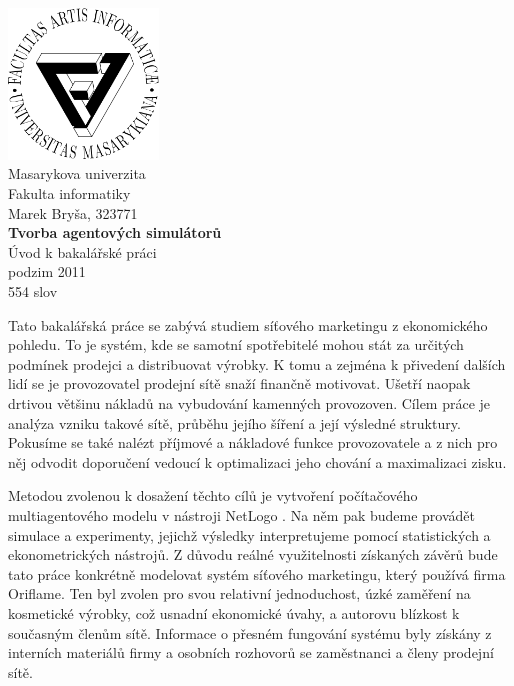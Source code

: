 \documentclass[a4paper,11pt]{report}
\begin{document}
\thispagestyle{empty}
\pagebreak
\mbox{}%
\\[2cm]
\begin{center}
\includegraphics[width=0.3\textwidth]{./filogo.pdf}\\[1cm]    

{\large Masarykova univerzita}\\[0.5cm]
{\large Fakulta informatiky}\\[0.5cm]
{\large Marek Bryša, 323771}\\[0.5cm]
{ \huge \bfseries Tvorba agentových simulátorů}\\[0.4cm]
{\large Úvod k bakalářské práci}\\[0.7cm]
\vfill
{\large podzim 2011}\\
{\large 554 slov}\\



\pagebreak

\end{center}

Tato bakalářská práce se zabývá studiem síťového marketingu z ekonomického pohledu. To je systém, kde se samotní spotřebitelé mohou stát za určitých podmínek prodejci a distribuovat výrobky. K tomu a zejména k přivedení dalších lidí se je provozovatel prodejní sítě snaží finančně motivovat. Ušetří naopak drtivou většinu nákladů na vybudování kamenných provozoven. Cílem práce je analýza vzniku takové sítě, průběhu jejího šíření a její výsledné struktury. Pokusíme se také nalézt příjmové a nákladové funkce provozovatele a z nich pro něj odvodit doporučení vedoucí k optimalizaci jeho chování a maximalizaci zisku.

Metodou zvolenou k dosažení těchto cílů je vytvoření počítačového multiagentového modelu \cite{gilbert} v nástroji NetLogo \cite{netlogo}. Na něm pak budeme provádět simulace a experimenty, jejichž výsledky interpretujeme pomocí statistických a ekonometrických nástrojů. Z důvodu reálné využitelnosti získaných závěrů bude tato práce konkrétně modelovat systém síťového marketingu, který používá firma Oriflame. Ten byl zvolen pro svou relativní jednoduchost, úzké zaměření na kosmetické výrobky, což usnadní ekonomické úvahy, a autorovu blízkost k současným členům sítě. Informace o přesném fungování systému byly získány z interních materiálů firmy \cite{oriflame} a osobních rozhovorů se zaměstnanci a členy prodejní sítě.
\end{document}
